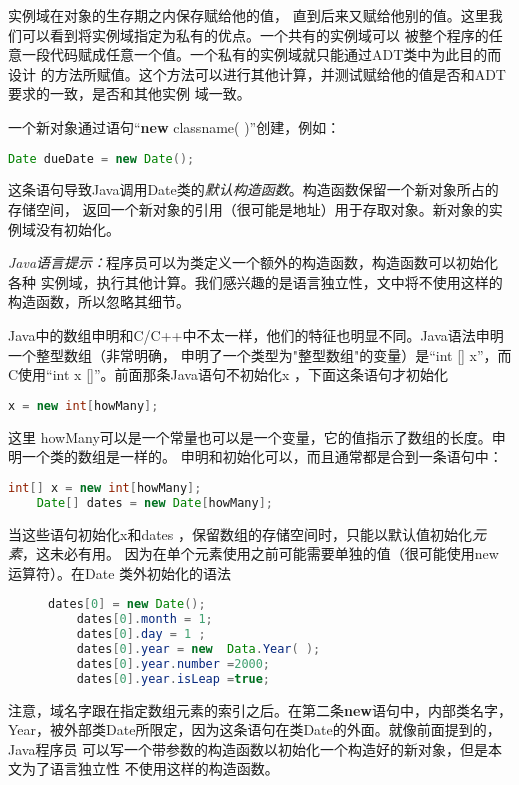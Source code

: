 实例域在对象的生存期之内保存赋给他的值，
直到后来又赋给他别的值。这里我们可以看到将实例域指定为私有的优点。一个共有的实例域可以
被整个程序的任意一段代码赋成任意一个值。一个私有的实例域就只能通过ADT类中为此目的而设计
的方法所赋值。这个方法可以进行其他计算，并测试赋给他的值是否和ADT要求的一致，是否和其他实例
域一致。

一个新对象通过语句“\textbf{new} classname(
)”创建，例如：
\begin{lstlisting}[language={Java}, keywordstyle=\color{blue!70}, commentstyle=\color{red!50!green!50!blue!50}]
    Date dueDate = new Date();
\end{lstlisting}
\noindent
这条语句导致Java调用Date类的\emph{默认构造函数}。构造函数保留一个新对象所占的存储空间，
返回一个新对象的引用（很可能是地址）用于存取对象。新对象的实例域没有初始化。

\textit{Java语言提示：}程序员可以为类定义一个额外的构造函数，构造函数可以初始化各种
实例域，执行其他计算。我们感兴趣的是语言独立性，文中将不使用这样的构造函数，所以忽略其细节。

Java中的数组申明和C/C++中不太一样，他们的特征也明显不同。Java语法申明一个整型数组（非常明确，
申明了一个类型为"整型数组"的变量）是“int []  x”，而C使用“int x
[]”。前面那条Java语句不初始化x ，下面这条语句才初始化
\begin{lstlisting}[language={Java}, keywordstyle=\color{blue!70}, commentstyle=\color{red!50!green!50!blue!50}]
    x = new int[howMany];
\end{lstlisting}
\noindent 这里
howMany可以是一个常量也可以是一个变量，它的值指示了数组的长度。申明一个类的数组是一样的。
申明和初始化可以，而且通常都是合到一条语句中：
\begin{lstlisting}[language={Java}, keywordstyle=\color{blue!70}, commentstyle=\color{red!50!green!50!blue!50}]
    int[] x = new int[howMany];
    Date[] dates = new Date[howMany];
\end{lstlisting}
\noindent 当这些语句初始化x和dates
，保留数组的存储空间时，只能以默认值初始化\emph{元素}，这未必有用。
因为在单个元素使用之前可能需要单独的值（很可能使用new
运算符）。在Date 类外初始化的语法
\begin{figure}
\begin{lstlisting}[language={Java}, keywordstyle=\color{blue!70}, commentstyle=\color{red!50!green!50!blue!50}]
    dates[0] = new Date();
    dates[0].month = 1;
    dates[0].day = 1 ;
    dates[0].year = new  Data.Year( );
    dates[0].year.number =2000;
    dates[0].year.isLeap =true;
\end{lstlisting}
\end{figure}
\noindent
注意，域名字跟在指定数组元素的索引之后。在第二条\textbf{new}语句中，内部类名字，
Year，被外部类Date所限定，因为这条语句在类Date的外面。就像前面提到的，Java程序员
可以写一个带参数的构造函数以初始化一个构造好的新对象，但是本文为了语言独立性
不使用这样的构造函数。

